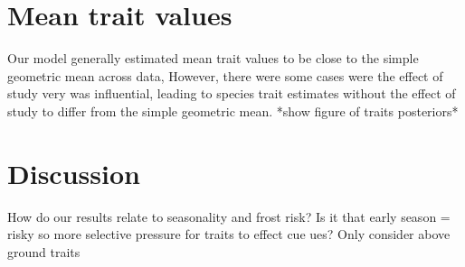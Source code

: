 \documentclass{article}\usepackage[]{graphicx}\usepackage[]{color}
\begin{document}
\section{Mean trait values}
Our model generally estimated mean trait values to be close to the simple geometric mean across data, However, there were some cases were the effect of study very was influential, leading to species trait estimates without the effect of study to differ from the simple geometric mean. *show figure of traits posteriors*  
 
\section{Discussion}

How do our results relate to seasonality and frost risk? Is it that early season = risky so more selective pressure for traits to effect cue ues?
Only consider above ground traits

\pagebreak
% 

\end{document}
